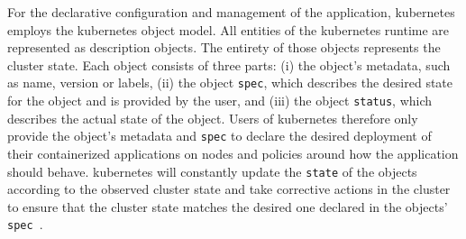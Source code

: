   For the declarative configuration and management of the application, \gls{kubernetes} employs the \gls{kubernetes} object model.
  All entities of the \gls{kubernetes} runtime are represented as description objects.
  The entirety of those objects represents the cluster state.
  Each object consists of three parts:
  (i) the object's metadata, such as name, version or labels,
  (ii) the object \texttt{spec}, which describes the desired state for the object and is provided by the user, and
  (iii) the object \texttt{status}, which describes the actual state of the object.
  Users of \gls{kubernetes} therefore only provide the object's metadata and \texttt{spec} to declare the desired deployment of their containerized applications on nodes and policies around how the application should behave.
  \Gls{kubernetes} will constantly update the \texttt{state} of the objects according to the observed cluster state and take corrective actions in the cluster to ensure that the cluster state matches the desired one declared in the objects' \texttt{spec}~\cite{kubernetes}.

